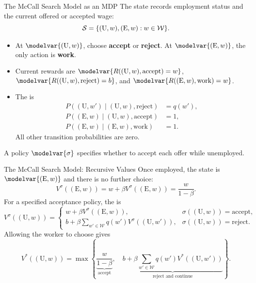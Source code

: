 \begin{frame}{The McCall Search Model as an MDP}
\small
The state records employment status and the current offered or accepted wage:
\[\mathcal S=\{(\mathrm U,w),(\mathrm E,w):w\in\mathcal W\}.\]
\begin{itemize}
\item At \(\modelvar{(\mathrm U,w)}\), choose \textbf{accept} or \textbf{reject}. At \(\modelvar{(\mathrm E,w)}\), the only action is \textbf{work}.
\item Current rewards are \(\modelvar{R((\mathrm U,w),\text{accept})=w}\), \(\modelvar{R((\mathrm U,w),\text{reject})=b}\), and \(\modelvar{R((\mathrm E,w),\text{work})=w}\).
\item The  is
\begin{align*}
P((\mathrm U,w')\mid(\mathrm U,w),\text{reject})&=q(w'),\\
P((\mathrm E,w)\mid(\mathrm U,w),\text{accept})&=1,\\
P((\mathrm E,w)\mid(\mathrm E,w),\text{work})&=1.
\end{align*}
All other transition probabilities are zero.
\end{itemize}
A policy \(\modelvar{\sigma}\) specifies whether to accept each offer while unemployed.
\end{frame}

\begin{frame}{The McCall Search Model: Recursive Values}
\small
Once employed, the state is \(\modelvar{(\mathrm E,w)}\) and there is no further choice:
\[V^\sigma((\mathrm E,w))=w+\beta V^\sigma((\mathrm E,w))=\frac{w}{1-\beta}.\]
For a specified acceptance policy, the  is
\[V^\sigma((\mathrm U,w))=
\begin{cases}
w+\beta V^\sigma((\mathrm E,w)),&\sigma((\mathrm U,w))=\text{accept},\\
b+\beta\sum_{w'\in\mathcal W}q(w')V^\sigma((\mathrm U,w')),&\sigma((\mathrm U,w))=\text{reject}.
\end{cases}\]
Allowing the worker to choose gives
\[V^*((\mathrm U,w))=\max\left\{
\underbrace{\frac{w}{1-\beta}}_{\text{accept}},\quad
\underbrace{b+\beta\sum_{w'\in\mathcal W}q(w')V^*((\mathrm U,w'))}_{\text{reject and continue}}\right\}.\]
\end{frame}


